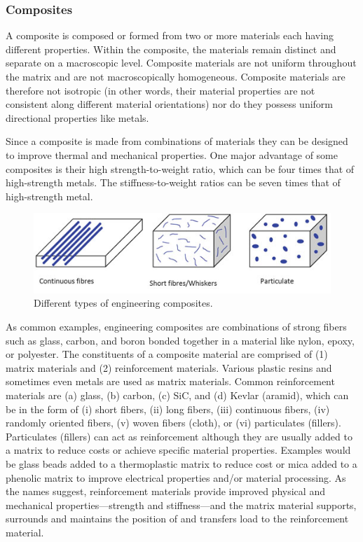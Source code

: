 \documentclass[a4paper,openany,nobib]{tufte-book}
\begin{document}
\subsubsection{Composites}
\label{composites}
A composite is composed or formed from two or more materials each having
different properties. Within the composite, the materials remain
distinct and separate on a macroscopic level. Composite materials are
not uniform throughout the matrix and are not macroscopically
homogeneous. Composite materials are therefore not isotropic (in other
words, their material properties are not consistent along different
material orientations) nor do they possess uniform directional
properties like metals.

Since a composite is made from combinations of materials they can be
designed to improve thermal and mechanical properties. One major
advantage of some composites is their high strength-to-weight ratio,
which can be four times that of high-strength metals. The
stiffness-to-weight ratios can be seven times that of high-strength
metal.


\begin{figure}[htbp]
\centering
\includegraphics[width=.9\linewidth]{pictures/Material-selection/composite-types.jpg}
\caption{Different types of engineering composites.}
\end{figure}

As common examples, engineering composites are combinations of strong
fibers such as glass, carbon, and boron bonded together in a material
like nylon, epoxy, or polyester. The constituents of a composite
material are comprised of (1) matrix materials and (2) reinforcement
materials. Various plastic resins and sometimes even metals are used as
matrix materials. Common reinforcement materials are (a) glass, (b)
carbon, (c) SiC, and (d) Kevlar (aramid), which can be in the form of
(i) short fibers, (ii) long fibers, (iii) continuous fibers, (iv)
randomly oriented fibers, (v) woven fibers (cloth), or (vi) particulates
(fillers). Particulates (fillers) can act as reinforcement although they
are usually added to a matrix to reduce costs or achieve specific
material properties. Examples would be glass beads added to a
thermoplastic matrix to reduce cost or mica added to a phenolic matrix
to improve electrical properties and/or material processing. As the
names suggest, reinforcement materials provide improved physical and
mechanical properties---strength and stiffness---and the matrix material
supports, surrounds and maintains the position of and transfers load to
the reinforcement material.
\end{document}

